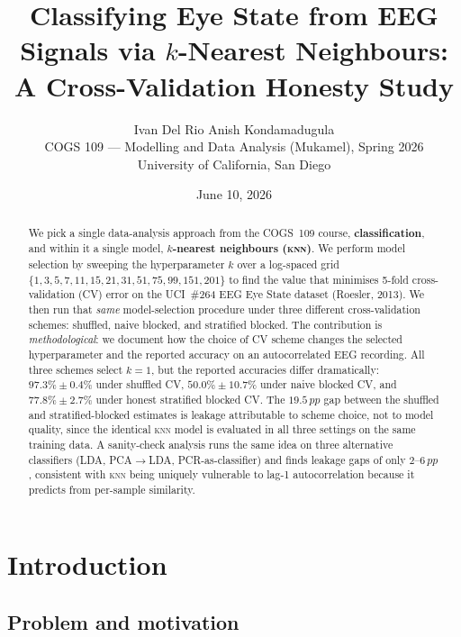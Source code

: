 \documentclass[11pt]{article}
\title{\bfseries Classifying Eye State from EEG Signals via
$k$-Nearest Neighbours:\\ A Cross-Validation Honesty Study}
\author{%
  Ivan Del Rio \qquad Anish Kondamadugula \\[4pt]
  \normalsize COGS 109 --- Modelling and Data Analysis (Mukamel), Spring 2026 \\
  \normalsize University of California, San Diego}
\date{June 10, 2026}
\newcommand{\pp}{\,pp}          %
\newcommand{\knn}{\textsc{knn}}
\begin{document}
\maketitle

\begin{abstract}
\noindent
We pick a single data-analysis approach from the COGS~109 course,
\textbf{classification}, and within it a single model,
\textbf{$k$-nearest neighbours (\knn{})}. We perform model
selection by sweeping the hyperparameter $k$ over a log-spaced grid
$\{1,3,5,7,11,15,21,31,51,75,99,151,201\}$ to find the value that minimises
5-fold cross-validation (CV) error on the UCI~\#264 EEG Eye State dataset
(Roesler, 2013). We then run that \emph{same} model-selection procedure
under three different cross-validation schemes: shuffled, naive blocked,
and stratified blocked. The contribution is \emph{methodological}: we
document how the choice of CV scheme changes the selected hyperparameter
and the reported accuracy on an autocorrelated EEG recording. All three
schemes select $k=1$, but the reported accuracies differ dramatically:
$97.3\% \pm 0.4\%$ under shuffled CV, $50.0\% \pm 10.7\%$ under naive
blocked CV, and $77.8\% \pm 2.7\%$ under honest stratified blocked CV. The
$19.5\pp$ gap between the shuffled and stratified-blocked estimates is
leakage attributable to scheme choice, not to model quality, since the
identical \knn{} model is evaluated in all three settings on the same
training data. A sanity-check analysis runs the same idea on three
alternative classifiers (LDA, PCA$\to$LDA, PCR-as-classifier) and finds
leakage gaps of only $2$--$6\pp$, consistent with \knn{} being uniquely
vulnerable to lag-1 autocorrelation because it predicts from per-sample
similarity.
\end{abstract}

\section{Introduction}

\subsection{Problem and motivation}
\end{document}
